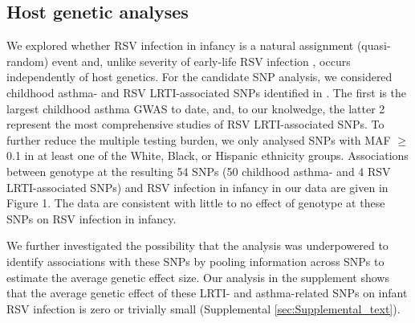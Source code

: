 \documentclass[9pt,lineno]{elife}  %
\begin{document}
\clearpage										

\subsection{Host genetic analyses}
We explored whether RSV infection in infancy is a natural assignment (quasi-random) event and, unlike severity of early-life RSV infection 
\citep{larkin2015genes},
 occurs independently of host genetics. 
 For the candidate SNP analysis, we considered childhood asthma- and RSV
LRTI-associated SNPs identified in 
\citet{pividori2019shared, janssen2007genetic, pasanen2017genome}. 
The first is the largest childhood asthma GWAS to date, and, to our knolwedge, the latter 2 represent the most comprehensive studies of RSV LRTI-associated
SNPs. To further reduce the multiple testing burden, we only analysed SNPs with MAF $\ge$ 0.1 in at least one of the White, Black, or Hispanic ethnicity groups. 
Associations between genotype at the resulting 54 SNPs (50 childhood asthma- and 4 RSV LRTI-associated SNPs) and RSV infection in infancy in our data are given in Figure 1. 
The data are consistent with little to no effect of genotype at these SNPs on RSV infection in infancy.

We further investigated the possibility that the analysis was underpowered to identify associations with these SNPs by pooling information across SNPs to estimate the average genetic effect
size. 
Our analysis in the supplement shows that the average genetic effect of these LRTI- and asthma-related SNPs on infant RSV infection is zero or trivially small (Supplemental \ref{sec:Supplemental_text}).
\end{document}
